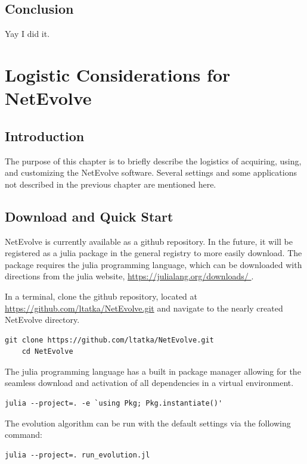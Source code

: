 \documentclass[12pt]{report}
\begin{document}
\section{Conclusion}
Yay I did it.
\\


	
\chapter{Logistic Considerations for NetEvolve}

\section{Introduction}
The purpose of this chapter is to briefly describe the logistics of acquiring, using, and customizing the NetEvolve software. Several settings and some applications not described in the previous chapter are mentioned here.

\section{Download and Quick Start}
NetEvolve is currently available as a github repository. In the future, it will be registered as a julia package in the general registry to more easily download. The package requires the julia programming language, which can be downloaded with directions from the julia website, \url{https://julialang.org/downloads/ }.

In a terminal, clone the github repository, located at \url{https://github.com/ltatka/NetEvolve.git} and navigate to the nearly created NetEvolve directory.


\begin{Verbatim}[frame=single]
	git clone https://github.com/ltatka/NetEvolve.git
	cd NetEvolve
\end{Verbatim}
The julia programming language has a built in package manager allowing for the seamless download and activation of all dependencies in a virtual environment.
\begin{Verbatim}[frame=single]
	julia --project=. -e `using Pkg; Pkg.instantiate()'
\end{Verbatim}

The evolution algorithm can be run with the default settings via the following command:
\begin{Verbatim}[frame=single]
	julia --project=. run_evolution.jl
\end{Verbatim}
\end{document}
